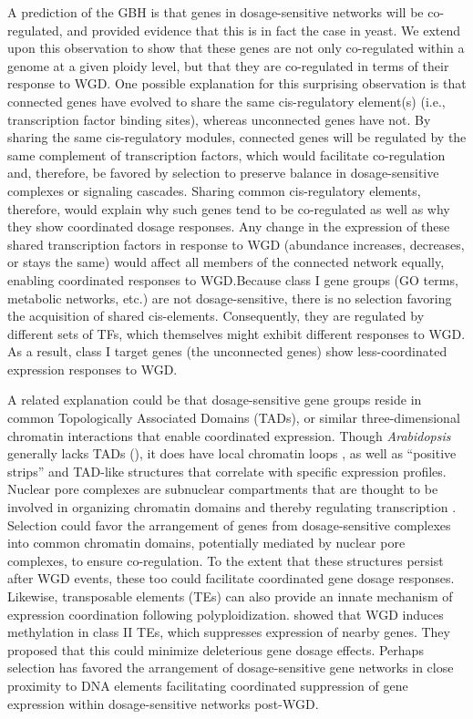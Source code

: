 \documentclass[11pt]{article}
\begin{document}
A prediction of the GBH is that genes in dosage-sensitive networks will be co-regulated, and \cite{papp2003} provided evidence that this is in fact the case in yeast. We extend upon this observation to show that these genes are not only co-regulated within a genome at a given ploidy level, but that they are co-regulated in terms of their response to WGD. 
One possible explanation for this surprising observation is that connected genes have evolved to share the same cis-regulatory element(s) (i.e., transcription factor binding sites), whereas unconnected genes have not. By sharing the same cis-regulatory modules, connected genes will be regulated by the same complement of transcription factors, which would facilitate co-regulation and, therefore, be favored by selection to preserve balance in dosage-sensitive complexes or signaling cascades. Sharing common cis-regulatory elements, therefore, would explain why such genes tend to be co-regulated as well as why they show coordinated dosage responses. Any change in the expression of these shared transcription factors in response to WGD (abundance increases, decreases, or stays the same) would affect all members of the connected network equally, enabling coordinated responses to WGD.Because class I gene groups (GO terms, metabolic networks, etc.) are not dosage-sensitive, there is no selection favoring the acquisition of shared cis-elements. Consequently, they are regulated by different sets of TFs, which themselves might exhibit different responses to WGD. As a result, class I target genes (the unconnected genes) show less-coordinated expression responses to WGD.

A related explanation could be that dosage-sensitive gene groups reside in common Topologically Associated Domains (TADs), or similar three-dimensional chromatin interactions that enable coordinated expression. Though {\it Arabidopsis} generally lacks TADs (\citep{liu2017}), it does have local chromatin loops \citep{liu2017}, as well as ``positive strips'' and TAD-like structures \citep{wang2015} that correlate with specific expression profiles. Nuclear pore complexes are subnuclear compartments that are thought to be involved in organizing chromatin domains and thereby regulating transcription \citep{sun2019}. Selection could favor the arrangement of genes from dosage-sensitive complexes into common chromatin domains, potentially mediated by nuclear pore complexes, to ensure co-regulation. To the extent that these structures persist after WGD events, these too could facilitate coordinated gene dosage responses. Likewise, transposable elements (TEs) can also provide an innate mechanism of expression coordination following polyploidization. \citep{zhang2015} showed that WGD induces methylation in class II TEs, which suppresses expression of nearby genes. They proposed that this could minimize deleterious gene dosage effects. Perhaps selection has favored the arrangement of dosage-sensitive gene networks in close proximity to DNA elements facilitating coordinated suppression of gene expression within dosage-sensitive networks post-WGD.
\end{document}
